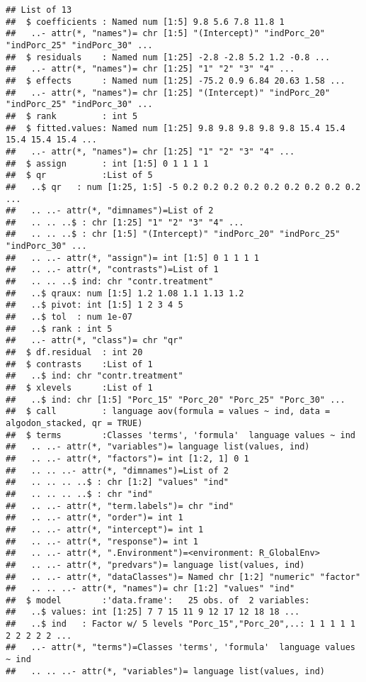 \documentclass[]{article}
\begin{document}
\begin{verbatim}
## List of 13
##  $ coefficients : Named num [1:5] 9.8 5.6 7.8 11.8 1
##   ..- attr(*, "names")= chr [1:5] "(Intercept)" "indPorc_20" "indPorc_25" "indPorc_30" ...
##  $ residuals    : Named num [1:25] -2.8 -2.8 5.2 1.2 -0.8 ...
##   ..- attr(*, "names")= chr [1:25] "1" "2" "3" "4" ...
##  $ effects      : Named num [1:25] -75.2 0.9 6.84 20.63 1.58 ...
##   ..- attr(*, "names")= chr [1:25] "(Intercept)" "indPorc_20" "indPorc_25" "indPorc_30" ...
##  $ rank         : int 5
##  $ fitted.values: Named num [1:25] 9.8 9.8 9.8 9.8 9.8 15.4 15.4 15.4 15.4 15.4 ...
##   ..- attr(*, "names")= chr [1:25] "1" "2" "3" "4" ...
##  $ assign       : int [1:5] 0 1 1 1 1
##  $ qr           :List of 5
##   ..$ qr   : num [1:25, 1:5] -5 0.2 0.2 0.2 0.2 0.2 0.2 0.2 0.2 0.2 ...
##   .. ..- attr(*, "dimnames")=List of 2
##   .. .. ..$ : chr [1:25] "1" "2" "3" "4" ...
##   .. .. ..$ : chr [1:5] "(Intercept)" "indPorc_20" "indPorc_25" "indPorc_30" ...
##   .. ..- attr(*, "assign")= int [1:5] 0 1 1 1 1
##   .. ..- attr(*, "contrasts")=List of 1
##   .. .. ..$ ind: chr "contr.treatment"
##   ..$ qraux: num [1:5] 1.2 1.08 1.1 1.13 1.2
##   ..$ pivot: int [1:5] 1 2 3 4 5
##   ..$ tol  : num 1e-07
##   ..$ rank : int 5
##   ..- attr(*, "class")= chr "qr"
##  $ df.residual  : int 20
##  $ contrasts    :List of 1
##   ..$ ind: chr "contr.treatment"
##  $ xlevels      :List of 1
##   ..$ ind: chr [1:5] "Porc_15" "Porc_20" "Porc_25" "Porc_30" ...
##  $ call         : language aov(formula = values ~ ind, data = algodon_stacked, qr = TRUE)
##  $ terms        :Classes 'terms', 'formula'  language values ~ ind
##   .. ..- attr(*, "variables")= language list(values, ind)
##   .. ..- attr(*, "factors")= int [1:2, 1] 0 1
##   .. .. ..- attr(*, "dimnames")=List of 2
##   .. .. .. ..$ : chr [1:2] "values" "ind"
##   .. .. .. ..$ : chr "ind"
##   .. ..- attr(*, "term.labels")= chr "ind"
##   .. ..- attr(*, "order")= int 1
##   .. ..- attr(*, "intercept")= int 1
##   .. ..- attr(*, "response")= int 1
##   .. ..- attr(*, ".Environment")=<environment: R_GlobalEnv> 
##   .. ..- attr(*, "predvars")= language list(values, ind)
##   .. ..- attr(*, "dataClasses")= Named chr [1:2] "numeric" "factor"
##   .. .. ..- attr(*, "names")= chr [1:2] "values" "ind"
##  $ model        :'data.frame':   25 obs. of  2 variables:
##   ..$ values: int [1:25] 7 7 15 11 9 12 17 12 18 18 ...
##   ..$ ind   : Factor w/ 5 levels "Porc_15","Porc_20",..: 1 1 1 1 1 2 2 2 2 2 ...
##   ..- attr(*, "terms")=Classes 'terms', 'formula'  language values ~ ind
##   .. .. ..- attr(*, "variables")= language list(values, ind)

\end{verbatim}
\end{document}
